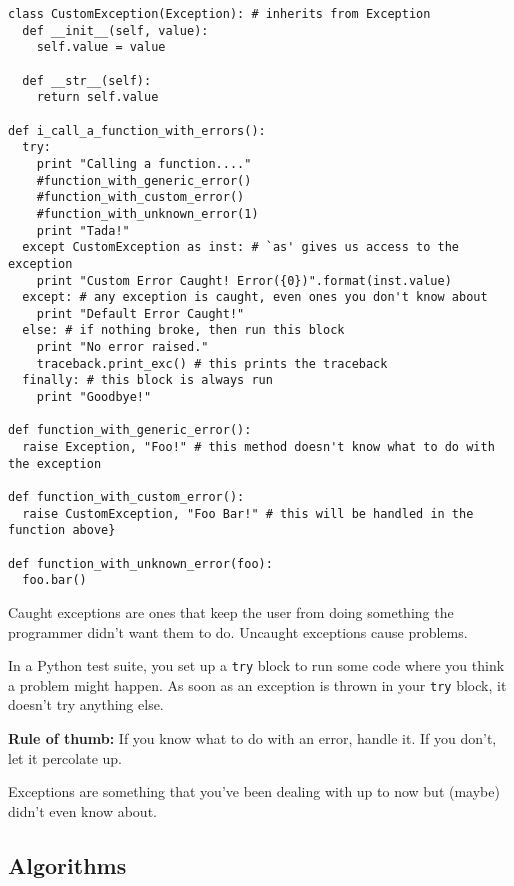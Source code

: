 \documentclass[12pt,letter]{article}
\begin{document}
\begin{verbatim}
class CustomException(Exception): # inherits from Exception
  def __init__(self, value):
    self.value = value
  
  def __str__(self):
    return self.value

def i_call_a_function_with_errors():
  try:
    print "Calling a function...."
    #function_with_generic_error()
    #function_with_custom_error()
    #function_with_unknown_error(1)
    print "Tada!"
  except CustomException as inst: # `as' gives us access to the exception
    print "Custom Error Caught! Error({0})".format(inst.value)
  except: # any exception is caught, even ones you don't know about
    print "Default Error Caught!"
  else: # if nothing broke, then run this block
    print "No error raised."
    traceback.print_exc() # this prints the traceback
  finally: # this block is always run
    print "Goodbye!"
  
def function_with_generic_error():
  raise Exception, "Foo!" # this method doesn't know what to do with
the exception
  
def function_with_custom_error():
  raise CustomException, "Foo Bar!" # this will be handled in the
function above}
  
def function_with_unknown_error(foo):
  foo.bar()
\end{verbatim}

Caught exceptions are ones that keep the user from doing something the
programmer didn't want them to do. Uncaught exceptions cause
problems. 

In a Python test suite, you set up a \texttt{try} block to run some
code where you think a problem might happen. As soon as an exception
is thrown in your \texttt{try} block, it doesn't try anything else. 

\textbf{Rule of thumb:} If you know what to do with an error, handle
it. If you don't, let it percolate up. 

Exceptions are something that you've been dealing with up to now but
(maybe) didn't even know about. 

\subsection{Algorithms}

\end{document}
